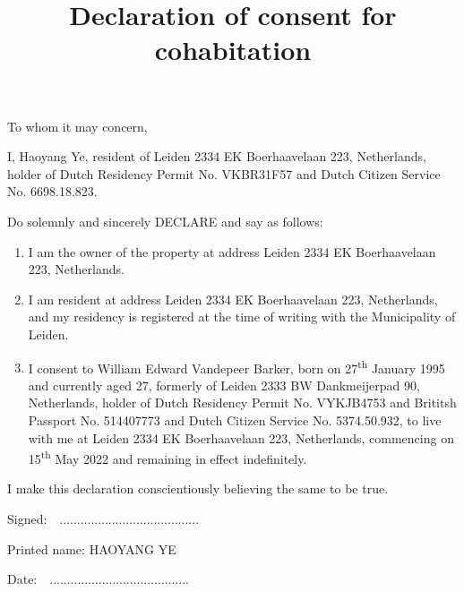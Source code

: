\documentclass{article}
\begin{document}
\title{Declaration of consent for cohabitation}
\date{}
\maketitle

To whom it may concern,

\vspace{5pt}

I, Haoyang Ye, resident of Leiden 2334 EK Boerhaavelaan 223, Netherlands,
holder of Dutch Residency Permit No. VKBR31F57 and Dutch Citizen Service No.
6698.18.823.

Do solemnly and sincerely DECLARE and say as follows:

\begin{enumerate}
\item I am the owner of the property at address Leiden 2334 EK Boerhaavelaan 223, Netherlands.
\item I am resident at address Leiden 2334 EK Boerhaavelaan 223, Netherlands, and my residency is registered at the time of writing with the Municipality of Leiden.
\item I consent to William Edward Vandepeer Barker, born on 27\textsuperscript{th} January 1995 and currently aged 27, formerly of Leiden 2333 BW Dankmeijerpad 90, Netherlands, holder of Dutch Residency Permit No. VYKJB4753 and Brititsh Passport No. 514407773 and Dutch Citizen Service No. 5374.50.932, to live with me at Leiden 2334 EK Boerhaavelaan 223, Netherlands, commencing on 15\textsuperscript{th} May 2022 and remaining in effect indefinitely.
\end{enumerate}

I make this declaration conscientiously believing the same to be true.

\vspace{20pt}

Signed:\ \ ........................................

Printed name: HAOYANG YE

Date:\ \ ........................................
\end{document}
